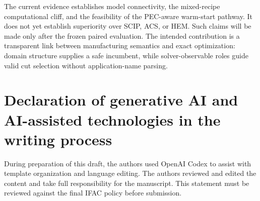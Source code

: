 \documentclass{ifacconf}
\begin{document}
The current evidence establishes model connectivity, the mixed-recipe computational cliff, and the feasibility of the PEC-aware warm-start pathway. It does not yet establish superiority over SCIP, ACS, or HEM. Such claims will be made only after the frozen paired evaluation. The intended contribution is a transparent link between manufacturing semantics and exact optimization: domain structure supplies a safe incumbent, while solver-observable roles guide valid cut selection without application-name parsing.

\section*{Declaration of generative AI and AI-assisted technologies in the writing process}
During preparation of this draft, the authors used OpenAI Codex to assist with template organization and language editing. The authors reviewed and edited the content and take full responsibility for the manuscript. This statement must be reviewed against the final IFAC policy before submission.


\end{document}
